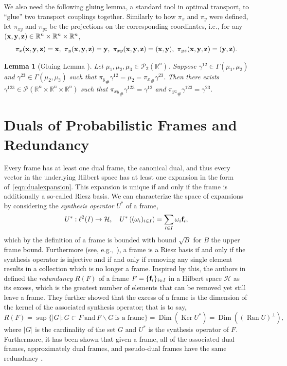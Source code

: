 \documentclass{amsart}
\numberwithin{equation}{section}
\DeclareMathOperator{\kernel}{Ker}
\DeclareMathOperator{\range}{Ran}
\DeclareMathOperator{\Dim}{Dim}
\newcommand\bof{{\bf f}}
\newcommand{\rar}{\rightarrow}
\newcommand{\cH}{\mathcal{H}}
\theoremstyle{plain}
\newtheorem{lemma}[theorem]{Lemma}
\theoremstyle{remark}
\theoremstyle{definition}
\begin{document}
We also need the following gluing lemma, a standard tool in optimal transport, to ``glue'' two transport couplings together. Similarly to how $\pi_x$ and $\pi_y$ were defined, let $\pi_{xy}$ and $\pi_{yz}$ be the projections on the corresponding coordinates, i.e.,  for any $({\bf x}, {\bf y}, {\bf z}) \in \mathbb{R}^n \times \mathbb{R}^n \times \mathbb{R}^n$, 
\begin{equation*}
    \pi_x({\bf x}, {\bf y}, {\bf z}) = {\bf x}, \ \pi_y({\bf x}, {\bf y}, {\bf z}) = {\bf y}, \ \pi_{xy}({\bf x}, {\bf y}, {\bf z})=({\bf x}, {\bf y}), \ \pi_{yz}({\bf x}, {\bf y}, {\bf z})=({\bf y}, {\bf z}).
\end{equation*}

\begin{lemma}[Gluing Lemma {\cite[p.~59]{figalli2021invitation}}]\label{gluinglemma} 
Let $\mu_1, \mu_2, \mu_3 \in \mathcal{P}_2(\mathbb{R}^n)$. Suppose $\gamma^{12} \in \Gamma(\mu_1, \mu_2)$ and $\gamma^{23} \in \Gamma(\mu_2, \mu_3)$ such that ${\pi_y}_{\#}\gamma^{12} = \mu_2 = {\pi_x}_{\#}\gamma^{23}$. Then there exists $\gamma^{123} \in \mathcal{P}(\mathbb{R}^n \times \mathbb{R}^n \times \mathbb{R}^n)$ such that ${\pi_{xy}}_{\#}\gamma^{123} = \gamma^{12}$ and ${\pi_{yz}}_{\#}\gamma^{123} = \gamma^{23}$. 
\end{lemma}

\section{Duals of Probabilistic Frames and Redundancy}\label{redundancy}
Every frame has at least one dual frame, the canonical dual, and thus every vector in the underlying Hilbert space has at least one expansion in the form of~\eqref{eqn:dualexpansion}. This expansion is unique if and only if the frame is additionally a so-called Riesz basis. We can characterize the space of expansions by considering the \emph{synthesis operator} $U^\ast$ of a frame, 
\[
U^\ast: \ell^2(I) \rar \cH, \quad U^\ast\left( (\omega_i)_{i \in I}\right) = \sum_{i \in I} \omega_i \bof_i,
\]
which by the definition of a frame is bounded with bound $\sqrt{B}$ for $B$ the upper frame bound. Furthermore (see, e.g.,~\cite{heil2011basis}), a frame is a Riesz basis if and only if the synthesis operator is injective and if and only if removing any single element results in a collection which is no longer a frame. Inspired by this, the authors in~\cite{balan2003deficits} defined the \emph{redundancy} $R(F)$ of a frame $F=\{{\bf f}_i\}_{i \in I}$ in a Hilbert space $\mathcal{H}$ as its excess, which is the greatest number of elements that can be removed yet still leave a frame. They further showed that the excess of a frame is the dimension of the kernel of the associated synthesis operator; that is to say, 
$$R(F) = \sup\{ |G|: G \subset F \ \text{and} \  F \backslash G \ \text{is a frame}\} = \Dim (\kernel U^*) =\Dim((\range U)^{\perp}),$$
where $|G|$ is the cardinality of the set $G$ and $U^*$ is the synthesis operator of $F$.  Furthermore, it has been shown that given a frame, all of the associated dual frames, approximately dual frames, and pseudo-dual frames have the same redundancy \cite{bakic2015excesses}. 
\end{document}
